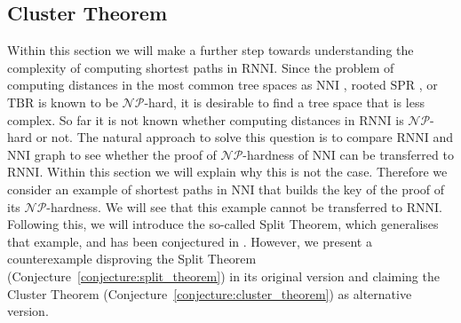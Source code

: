 \documentclass{amsart}
\newcommand{\np}{\mathcal{NP}}
\newcommand{\nni}{\mathrm{NNI}}
\newcommand{\rnni}{\mathrm{RNNI}}
\newcommand{\tbr}{\mathrm{TBR}}
\newcommand{\spr}{\mathrm{SPR}}
\begin{document}
%
%

\subsection{Cluster Theorem}
\label{section:cluster_theorem}

Within this section we will make a further step towards understanding the complexity of computing shortest paths in $\rnni$.
Since the problem of computing distances in the most common tree spaces as $\nni$ \autocite{Dasgupta2000-xa}, rooted $\spr$ \autocite{Bordewich2005-nx}, or $\tbr$ \autocite{Allen2001-ky} is known to be $\np$-hard, it is desirable to find a tree space that is less complex.
So far it is not known whether computing distances in $\rnni$ is $\np$-hard or not.
The natural approach to solve this question is to compare $\rnni$ and $\nni$ graph to see whether the proof of $\np$-hardness of $\nni$ can be transferred to $\rnni$.
Within this section we will explain why this is not the case.
Therefore we consider an example of shortest paths in $\nni$ that builds the key of the proof of its $\np$-hardness.
We will see that this example cannot be transferred to $\rnni$.
Following this, we will introduce the so-called Split Theorem, which generalises that example, and has been conjectured in \autocite{Gavryushkin2018-ol}.
However, we present a counterexample disproving the Split Theorem (Conjecture~\ref{conjecture:split_theorem}) in its original version and claiming the Cluster Theorem (Conjecture~\ref{conjecture:cluster_theorem}) as alternative version.
\end{document}
